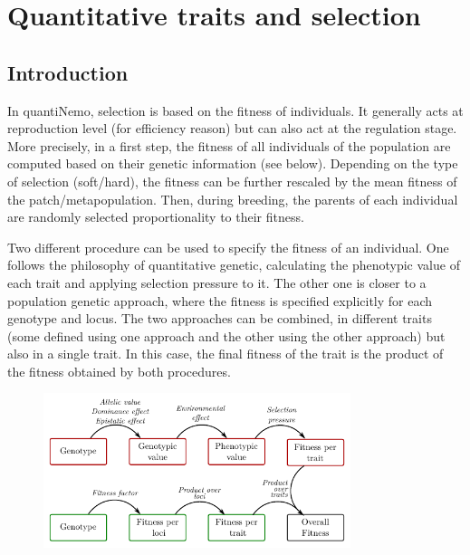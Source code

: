 \documentclass[letterpaper,12pt,oneside]{book}
\begin{document}
\chapter{Quantitative traits and selection}\label{chap:QuantitativeTraitsAndSelection}
\section{Introduction}
In quantiNemo,  selection is based on the fitness of individuals. It generally acts at reproduction level (for efficiency reason) but can also act at the regulation stage. 
More precisely, in a first step, the fitness of all individuals of the population are computed based on their genetic information (see below). Depending on the type of selection (soft/hard), the fitness can be further rescaled by the mean fitness of the patch/metapopulation. Then, during breeding, the parents of each individual are randomly selected proportionality to their fitness.  

Two different procedure can be used to specify the fitness of an individual. One follows the philosophy of quantitative genetic, calculating the phenotypic value of each trait and applying selection pressure to it. The other one is closer to a population genetic approach, where the fitness is specified explicitly for each genotype and locus. The two approaches can be combined, in different traits (some defined using one approach and the other using the other approach) but also in a single trait. In this case, the final fitness of the trait is the product of the fitness obtained by both procedures. 
\begin{figure}[h]
    \centering
        \includegraphics[width=0.80\textwidth]{selection.pdf}
    \label{fig:life-cycle}
\end{figure}
\end{document}
